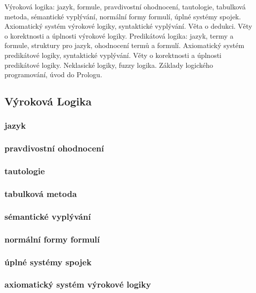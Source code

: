 \documentclass[10pt,a4paper]{article}
\begin{document}
Výroková logika: jazyk, formule, pravdivostní ohodnocení, tautologie, tabulková metoda, sémantické vyplývání,
normální formy formulí, úplné systémy spojek. Axiomatický systém výrokové logiky, syntaktické vyplývání. Věta
o dedukci. Věty o korektnosti a úplnosti výrokové logiky. Predikátová logika: jazyk, termy a formule, struktury
pro jazyk, ohodnocení termů a formulí. Axiomatický systém predikátové logiky, syntaktické vyplývání. Věty o
korektnosti a úplnosti predikátové logiky. Neklasické logiky, fuzzy logika. Základy logického programování, úvod
do Prologu.


	\subsection{Výroková Logika}


		\subsubsection{ jazyk}
 
		\subsubsection{pravdivostní ohodnocení}
 
		\subsubsection{tautologie}
 
		\subsubsection{tabulková metoda}
 
		\subsubsection{sémantické vyplývání}
 
		\subsubsection{normální formy formulí}
 
		\subsubsection{úplné systémy spojek}

		\subsubsection{axiomatický systém výrokové logiky}
\end{document}
